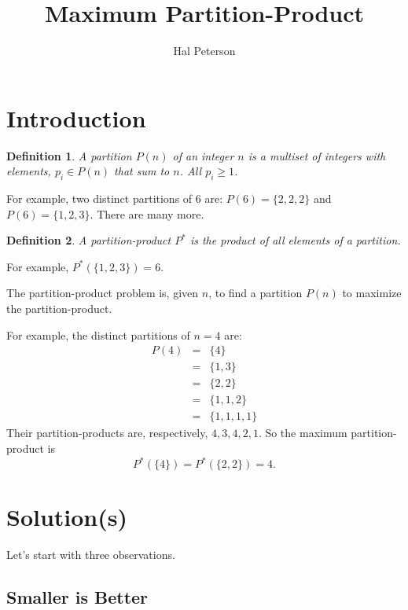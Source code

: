 \documentclass[twocolumn]{article}
\title{Maximum Partition-Product}
\author{Hal Peterson}
\newtheorem{definition}{Definition}
\begin{document}
\maketitle

\section{Introduction}

\begin{definition}
  \label{definition:partition}
  A partition $P(n)$ of an integer $n$ is a multiset of integers with elements, $p_i \in P(n)$ that sum to $n$.
  All $p_i \geq 1$.
\end{definition}

For example, two distinct partitions of 6 are: $P(6) = \{ 2, 2, 2 \}$ and $P(6) = \{ 1, 2, 3 \}$.  There are many more.

\begin{definition}
  \label{definition:partition-product}
  A partition-product $P^*$ is the product of all elements of a partition.
\end{definition}

For example, $P^*(\{ 1, 2, 3 \}) = 6$.

The partition-product problem is, given $n$, to find a partition $P(n)$ to maximize the partition-product.

For example, the distinct partitions of $n=4$ are:
\begin{eqnarray*}
  P(4) & = & \{ 4 \} \\
  & = & \{ 1, 3 \} \\
  & = & \{ 2, 2 \} \\
  & = & \{ 1, 1, 2 \} \\
  & = & \{ 1, 1, 1, 1 \}
\end{eqnarray*}
Their partition-products are, respectively, $4, 3, 4, 2, 1$.  So the maximum partition-product is
\begin{equation*}
  P^*(\{ 4 \}) = P^*(\{ 2, 2 \}) = 4.
\end{equation*}

\section{Solution(s)}

Let's start with three observations.

\subsection{Smaller is Better}
\end{document}
